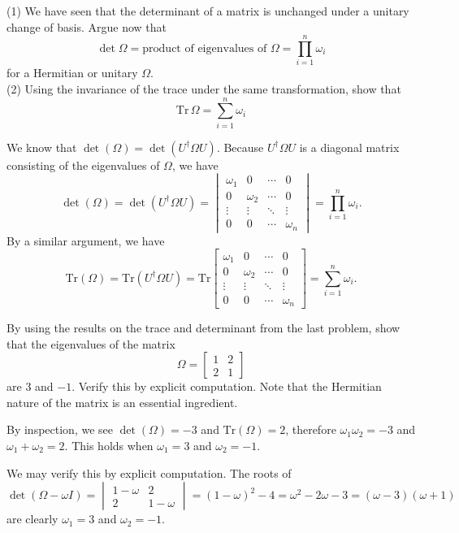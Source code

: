 \documentclass[../principles-of-quantum-mechanics.tex]{subfiles}
\begin{document}
\begin{questions}
\question (1) We have seen that the determinant of a matrix is unchanged under a unitary change of basis. Argue now that
\[
	\det\Omega = \text{product of eigenvalues of }\Omega = \prod_{i=1}^n\omega_i
\]
for a Hermitian or unitary $\Omega$. \\
(2) Using the invariance of the trace under the same transformation, show that
\[
	\mathrm{Tr}\,\Omega = \sum_{i=1}^n\omega_i
\]

\begin{solution}
	We know that $\det(\Omega) = \det(U^\dagger\Omega{U})$. Because $U^\dagger\Omega{U}$ is a diagonal matrix consisting of the eigenvalues of $\Omega$, we have
	\[
		\det(\Omega) = \det(U^\dagger\Omega{U}) = \begin{vmatrix}\omega_1 & 0 & \cdots & 0 \\ 0 & \omega_2 & \cdots & 0 \\ \vdots & \vdots & \ddots & \vdots \\ 0 & 0 & \cdots & \omega_n\end{vmatrix} = \prod_{i=1}^n\omega_i.
	\]
	By a similar argument, we have
	\[
	\mathrm{Tr}(\Omega) = \mathrm{Tr}(U^\dagger\Omega{U}) = \mathrm{Tr}\begin{bmatrix}\omega_1 & 0 & \cdots & 0 \\ 0 & \omega_2 & \cdots & 0 \\ \vdots & \vdots & \ddots & \vdots \\ 0 & 0 & \cdots & \omega_n\end{bmatrix} = \sum_{i=1}^n\omega_i.
	\]
\end{solution}

\question By using the results on the trace and determinant from the last problem, show that the eigenvalues of the matrix
\[
	\Omega = \begin{bmatrix}1 & 2 \\ 2 & 1\end{bmatrix}
\]
are $3$ and $-1$. Verify this by explicit computation. Note that the Hermitian nature of the matrix is an essential ingredient.

\begin{solution}
	By inspection, we see $\det(\Omega) = -3$ and $\mathrm{Tr}(\Omega) = 2$, therefore $\omega_1\omega_2 = -3$ and $\omega_1 + \omega_2 = 2$. This holds when $\omega_1 = 3$ and $\omega_2 = -1$.
	
	We may verify this by explicit computation. The roots of
	\[
		\det(\Omega - \omega{I}) = \begin{vmatrix}1 - \omega & 2 \\ 2 & 1 - \omega\end{vmatrix} = (1-\omega)^2 - 4 = \omega^2 - 2\omega - 3 = (\omega-3)(\omega+1)
	\]
	are clearly $\omega_1 = 3$ and $\omega_2 = -1$.
\end{solution}


\end{questions}
\end{document}
